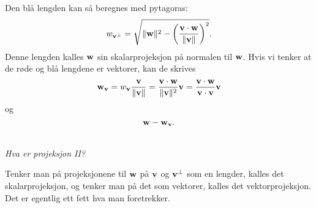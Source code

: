 Den blå lengden kan så beregnes med pytagoras:
\[
w_{\mathbf{v}^{\perp}}=\sqrt{\|\mathbf{w}\|^2-\left(\frac{\mathbf{v} \cdot \mathbf{w}}{\|\mathbf{v}\|}\right)^2}.
\]
Denne lengden kalles $\mathbf{w}$ sin skalarprojeksjon på normalen til $\mathbf{w}$. Hvis vi tenker at de røde og blå lengdene er vektorer, kan de skrives
\[
\mathbf{w}_{\mathbf{v}}=w_{\mathbf{v}}\frac{\mathbf{v}}{\|\mathbf{v}\|}=\frac{\mathbf{v} \cdot \mathbf{w}}{\|\mathbf{v}\|^2}\mathbf{v}=\frac{\mathbf{v} \cdot \mathbf{w}}{\mathbf{v} \cdot \mathbf{v}}\mathbf{v}
\]
og
\[
\mathbf{w} - \mathbf{w}_{\mathbf{v}}.
\]
 \begin{center}
\\
{\small \textit{Hva er projeksjon II?}}
\end{center}
Tenker man på projeksjonene til $\mathbf{w}$ på $\mathbf{v}$ og $\mathbf{v}^{\perp}$ som en lengder, kalles det skalarprojeksjon, og tenker man på det som vektorer, kalles det vektorprojeksjon. Det er egentlig ett fett hva man foretrekker.

